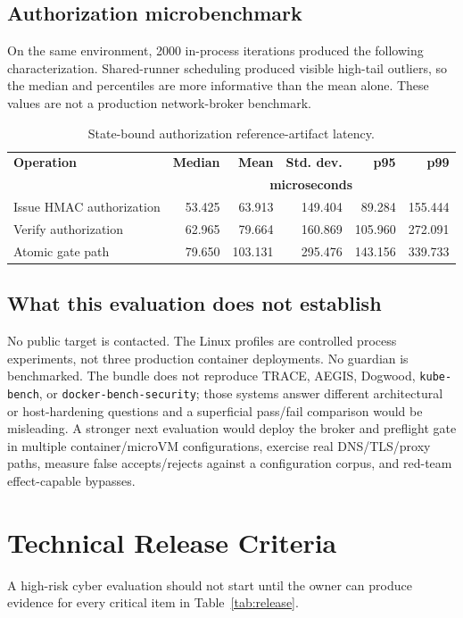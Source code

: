 \documentclass[11pt,letterpaper]{article}
\newcommand{\code}[1]{\texttt{#1}}
\begin{document}
\subsection{Authorization microbenchmark}
On the same environment, 2000 in-process iterations produced the following characterization. Shared-runner scheduling produced visible high-tail outliers, so the median and percentiles are more informative than the mean alone. These values are not a production network-broker benchmark.
\begin{table}[htbp]
\centering
\caption{State-bound authorization reference-artifact latency.}
\small
\begin{tabular}{lrrrrr}
\toprule
\textbf{Operation} & \textbf{Median} & \textbf{Mean} & \textbf{Std. dev.} & \textbf{p95} & \textbf{p99} \\
 & \multicolumn{5}{c}{\textbf{microseconds}} \\
\midrule
Issue HMAC authorization & 53.425 & 63.913 & 149.404 & 89.284 & 155.444 \\
Verify authorization & 62.965 & 79.664 & 160.869 & 105.960 & 272.091 \\
Atomic gate path & 79.650 & 103.131 & 295.476 & 143.156 & 339.733 \\
\bottomrule
\end{tabular}
\end{table}

\subsection{What this evaluation does not establish}
No public target is contacted. The Linux profiles are controlled process experiments, not three production container deployments. No guardian is benchmarked. The bundle does not reproduce TRACE, AEGIS, Dogwood, \code{kube-bench}, or \code{docker-bench-security}; those systems answer different architectural or host-hardening questions and a superficial pass/fail comparison would be misleading. A stronger next evaluation would deploy the broker and preflight gate in multiple container/microVM configurations, exercise real DNS/TLS/proxy paths, measure false accepts/rejects against a configuration corpus, and red-team effect-capable bypasses.

\section{Technical Release Criteria}
A high-risk cyber evaluation should not start until the owner can produce evidence for every critical item in Table~\ref{tab:release}.
\end{document}
